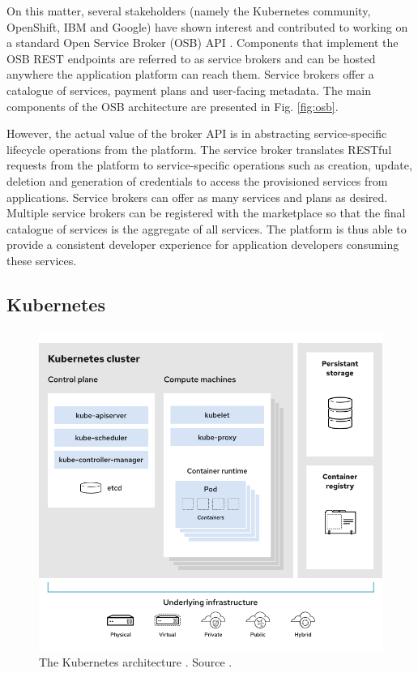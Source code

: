 On this matter, several stakeholders (namely the Kubernetes community, OpenShift, IBM and Google) have shown interest and contributed to working on a standard Open Service Broker (OSB) API \cite{osb}. Components that implement the OSB REST endpoints are referred to as service brokers and can be hosted anywhere the application platform can reach them. Service brokers offer a catalogue of services, payment plans and user-facing metadata. The main components of the OSB architecture are presented in Fig. \ref{fig:osb}.

However, the actual value of the broker API is in abstracting service-specific lifecycle operations from the platform. The service broker translates RESTful requests from the platform to service-specific operations such as creation, update, deletion and generation of credentials to access the provisioned services from applications. Service brokers can offer as many services and plans as desired. Multiple service brokers can be registered with the marketplace so that the final catalogue of services is the aggregate of all services. The platform is thus able to provide a consistent developer experience for application developers consuming these services.

\subsection{Kubernetes}
\label{sec:kubernetes}

\begin{figure}[h]
\centering
\includegraphics[width=\columnwidth]{figures/kubernetes}
\caption{The Kubernetes architecture \label{fig:kubernetes}. Source \cite{k8s-architecture}.}
\end{figure}

